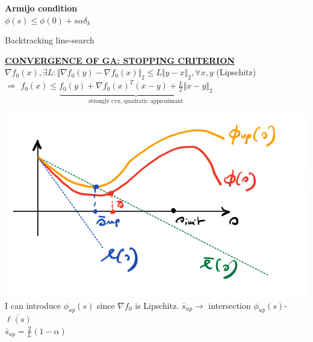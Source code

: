 \documentclass[a4paper]{article}
\begin{document}
\begin{multicols}{2}
\begin{multicols}{2}
        \noindent 
        \textbf{Armijo condition}\\
        $\phi(s)\le\phi(0)+s\alpha\delta_k$
    \end{multicols}
    \vspace{-1.5cm}
    \newcolumn
    \begin{algorithm}[H]
        \caption{Backtracking line-search}
        \begin{algorithmic}[1]
            \Else 
                 
            \EndIf
        \end{algorithmic}
    \end{algorithm}
    \vspace{-0.3cm}
    \noindent
    \textbf{\underline{CONVERGENCE OF GA: STOPPING CRITERION}}
    {\small $\nabla{f_0(x)}, \exists{L}: \Vert \nabla{f_0(y)}-\nabla{f_0(x)} \Vert_2 \le L\Vert y-x \Vert_2, \forall{x,y}$} {\small{(Lipschitz)} }\\
    $\Rightarrow$ $f_0(x) \le \underbrace{f_0(y) + \nabla{f_0(x)}^T(x-y)+\frac{L}{2}\Vert x-y \Vert_2}_{\text{strongly cvx, quadratic approximant}}$
    \begin{multicols}{2}
        \noindent
        \includegraphics[scale=0.3]{img/gradient_2.png}
        \newcolumn\\
        I can introduce $\phi_{up}(s)$ since $\nabla{f_0}$ is Lipschitz. $\bar{s}_{up}\to$ intersection $\phi_{up}(s)$-$\bar{\ell(s)}$\\
        $\bar{s}_{up}=\frac{2}{L}(1-\alpha)$\\


\end{multicols}
\end{multicols}
\end{document}
